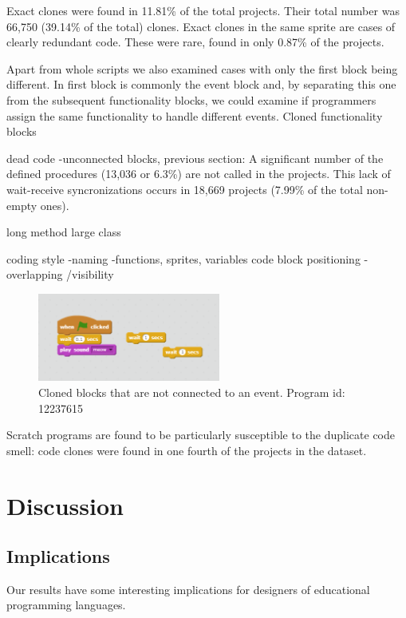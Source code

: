 \documentclass{sig-alternate}
\begin{document}
Exact clones were found in 11.81\% of the total projects. Their total number was 66,750 (39.14\% of the total) clones. Exact clones in the same sprite are cases of clearly redundant code. These were rare, found in only 0.87\% of the projects.

Apart from whole scripts we also examined cases with only the first block being different. In first block is commonly the event block and, by separating this one from the subsequent functionality blocks, we could examine if programmers assign the same functionality to handle different events. Cloned functionality blocks



dead code -unconnected blocks,
previous section: A significant number of the defined procedures (13,036 or 6.3\%) are not called in the projects.
This lack of wait-receive syncronizations occurs in 18,669 projects (7.99\% of the total non-empty ones).

long method
large class


coding style -naming -functions, sprites, variables
code block positioning - overlapping /visibility


\begin{figure}
	\begin{center}
		\includegraphics[width=6cm]{fig/Unconnected_clones.png}
		\caption{Cloned blocks that are not connected to an event. Program id: 12237615}
		\label{fig:Unconnected_clones}
	\end{center}
\end{figure} 



Scratch programs are found to be particularly susceptible to the duplicate code smell: code clones were found in one fourth of the projects in the dataset.


\section{Discussion}

\subsection{Implications}
Our results have some interesting implications for designers of educational programming languages. 
\end{document}
